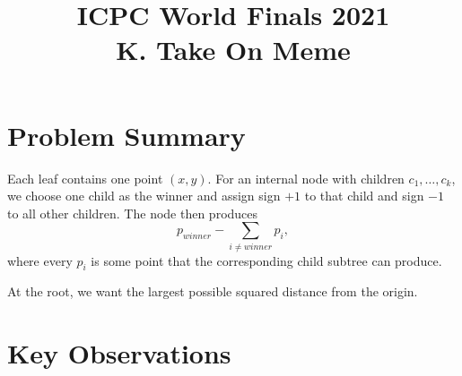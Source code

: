 \documentclass[11pt]{article}
\title{ICPC World Finals 2021\\K. Take On Meme}
\author{}
\date{}
\begin{document}
\maketitle

\section*{Problem Summary}

Each leaf contains one point $(x,y)$. For an internal node with children $c_1,\dots,c_k$, we choose one
child as the winner and assign sign $+1$ to that child and sign $-1$ to all other children. The node then
produces
\[
    p_{winner} - \sum_{i \ne winner} p_i,
\]
where every $p_i$ is some point that the corresponding child subtree can produce.

At the root, we want the largest possible squared distance from the origin.

\section*{Key Observations}
\end{document}
